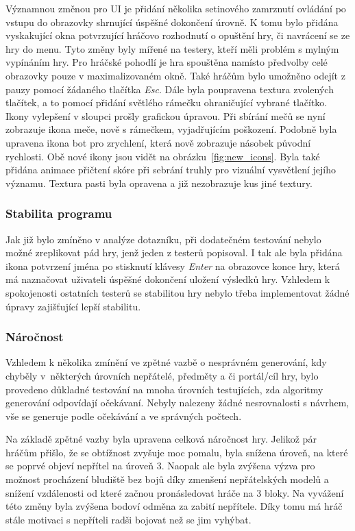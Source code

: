 Významnou změnou pro UI je přidání několika setinového zamrznutí ovládání po vstupu do obrazovky shrnující úspěšné dokončení úrovně. K tomu bylo přidána vyskakující okna potvrzující hráčovo rozhodnutí o opuštění hry, či navrácení se ze hry do menu. Tyto změny byly mířené na testery, kteří měli problém s mylným vypínáním hry. Pro hráčské pohodlí je hra spouštěna namísto předvolby celé obrazovky pouze v maximalizovaném okně. Také hráčům bylo umožněno odejít z pauzy pomocí žádaného tlačítka \textit{Esc}. Dále byla poupravena textura zvolených tlačítek, a to pomocí přidání světlého rámečku ohraničující vybrané tlačítko.
Ikony vylepšení v sloupci  prošly grafickou úpravou. Při sbírání mečů se nyní zobrazuje ikona meče, nově s rámečkem, vyjadřujícím poškození. Podobně byla upravena ikona bot pro zrychlení, která nově zobrazuje násobek původní rychlosti. Obě nové ikony jsou vidět na obrázku~\ref{fig:new_icons}. Byla také přidána animace přičtení skóre při sebrání truhly pro vizuální vysvětlení jejího významu. Textura pasti byla opravena a již nezobrazuje kus jiné textury.

\subsubsection*{\textbullet Stabilita programu}
Jak již bylo zmíněno v analýze dotazníku, při dodatečném testování nebylo možné zreplikovat pád hry, jenž jeden z testerů popisoval. I tak ale byla přidána ikona potvrzení jména po stisknutí klávesy \textit{Enter} na obrazovce konce hry, která má naznačovat uživateli úspěšné dokončení uložení výsledků hry. Vzhledem k spokojenosti ostatních testerů se stabilitou hry nebylo třeba implementovat žádné úpravy zajišťující lepší stabilitu.

\subsubsection*{\textbullet Náročnost}
Vzhledem k několika zmínění ve zpětné vazbě o nesprávném generování, kdy chyběly v~některých úrovních nepřátelé, předměty a či portál/cíl hry, bylo provedeno důkladné testování na mnoha úrovních testujících, zda algoritmy generování odpovídají očekávaní. Nebyly nalezeny žádné nesrovnalosti s návrhem, vše se generuje podle očekávání a ve správných počtech.

Na základě zpětné vazby byla upravena celková náročnost hry. Jelikož pár hráčům přišlo, že se obtížnost zvyšuje moc pomalu, byla snížena úroveň, na které se poprvé objeví nepřítel na úroveň 3. Naopak ale byla zvýšena výzva pro možnost procházení bludiště bez bojů díky zmenšení nepřátelských modelů a snížení vzdálenosti od které začnou pronásledovat hráče na 3 bloky. Na vyvážení této změny byla zvýšena bodoví odměna za zabití nepřítele. Díky tomu má hráč stále motivaci s nepříteli radši bojovat než se jim vyhýbat.

